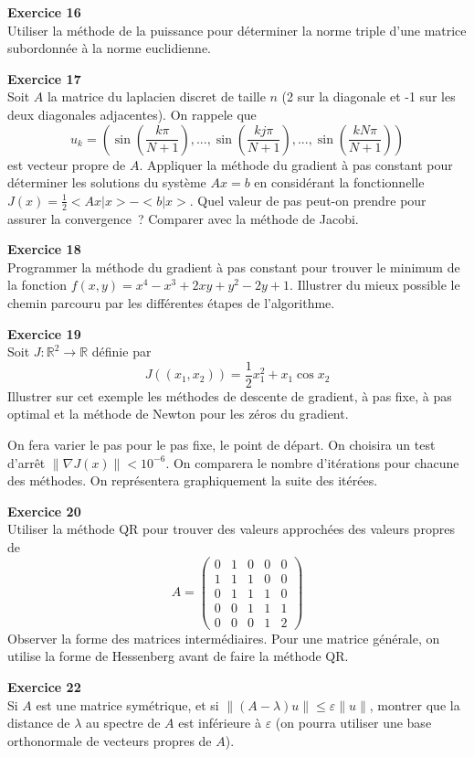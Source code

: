 \documentclass[10pt,a4paper]{article}
\newcommand{\R}{\mathbb R}
\def\demi{\frac{1}{2}}
\def\1{{\rm 1\kern-.8ex 1}}
\begin{document}
{\bf Exercice 16}\\
Utiliser la m\'ethode de la puissance pour d\'eterminer la norme
triple d'une matrice subordonn\'ee \`a la norme euclidienne.


{\bf Exercice 17}\\
Soit $A$ la matrice du laplacien discret de taille $n$ (2 sur la
diagonale et -1 sur les deux diagonales adjacentes).
On rappele que
$$u_k=(\sin(\frac{k\pi}{N+1}),...,
\sin(\frac{kj\pi}{N+1}),...,\sin(\frac{kN\pi}{N+1})) $$
est vecteur propre de $A$.
Appliquer la m\'ethode du gradient \`a pas constant pour
d\'eterminer les solutions du syst\`eme $Ax=b$ en
consid\'erant la fonctionnelle $J(x)=\frac12<Ax|x>-<b|x>$.
Quel valeur de pas peut-on prendre pour assurer la convergence~?
Comparer avec la m\'ethode de Jacobi.

{\bf Exercice 18}\\
Programmer la m\'ethode du gradient \`a pas constant pour trouver le
minimum de la fonction $f(x,y)=x^4-x^3+2xy+y^2-2y+1$. Illustrer du mieux
possible le chemin parcouru par les diff\'erentes \'etapes de l'algorithme.


{\bf Exercice 19}\\
Soit $J:\R^2\rightarrow\R$ définie par 
$$J((x_1,x_2))=\demi x_1^2+x_1\cos x_2$$
Illustrer sur cet exemple les méthodes de descente de gradient, à pas
fixe, à pas optimal
et la méthode de Newton pour les zéros du gradient.

On fera varier le pas pour le pas fixe, le point de départ.
On choisira un test d'arrêt $\|\nabla J(x)\|<10^{-6}$.
On comparera le nombre d'itérations pour chacune des méthodes.
On repr\'esentera graphiquement la suite des it\'er\'ees.


{\bf Exercice 20}\\
Utiliser la méthode QR pour trouver des valeurs approchées 
des valeurs propres de 
 \[A=\left(\begin{array}{ccccc}
0&1&0&0&0\\1&1&1&0&0\\0&1&1&1&0\\0&0&1&1&1\\0&0&0&1&2
\end{array}\right)\]
Observer la forme des matrices intermédiaires.
Pour une matrice g\'en\'erale, on utilise la forme de Hessenberg avant
de faire la m\'ethode QR.

{\bf Exercice 22}\\
Si $A$ est une matrice sym\'etrique, et si $\|(A-\lambda) u\| \leq
\varepsilon \| u\|$, montrer que la distance de $\lambda$ au spectre
de $A$ est inf\'erieure \`a $\varepsilon$ (on pourra utiliser une base
orthonormale de vecteurs propres de $A$).
\end{document}
